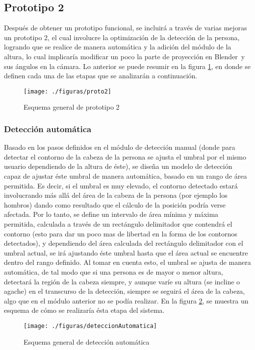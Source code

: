 \documentclass[a4paper,openright,12pt]{report}
\begin{document}
\subsection{Prototipo 2}
Después de obtener un prototipo funcional, se incluirá a través de varias mejoras un prototipo 2, el cual involucre la optimización de la detección de la persona, logrando que se realice de manera automática y la adición del módulo de la altura, lo cual implicaría modificar un poco la parte de proyección en Blender\textcopyright\ y sus ángulos en la cámara. Lo anterior se puede resumir en la figura \ref{fig:proto2}, en donde se definen cada una de las etapas que se analizarán a continuación.
\begin{figure}[th]
	\centering
	\texttt{[image: ./figuras/proto2]}
	\caption{Esquema general de prototipo 2} \label{fig:proto2}
\end{figure}

\subsubsection{Detección automática}
Basado en los pasos definidos en el módulo de detección manual (donde para detectar el contorno de la cabeza de la persona se ajusta el umbral por el mismo usuario dependiendo de la altura de éste), se diseña un modelo de detección capaz de ajustar éste umbral de manera automática, basado en un rango de área permitida. Es decir, si el umbral es muy elevado, el contorno detectado estará involucrando más allá del área de la cabeza de la persona (por ejemplo los hombros) dando como resultado que el cálculo de la posición podría verse afectada. Por lo tanto, se define un intervalo de área mínima y máxima permitida, calculada a través de un rectángulo delimitador que contendrá el contorno (esto para dar un poco mas de libertad en la forma de los contornos detectados), y dependiendo del área calculada del rectángulo delimitador con el umbral actual, se irá ajustando éste umbral hasta que el área actual se encuentre dentro del rango definido. Al tomar en cuenta esto, el umbral se ajusta de manera automática, de tal modo que si una persona es de mayor o menor altura, detectará la región de la cabeza siempre, y aunque varíe su altura (se incline o agache) en el transcurso de la detección, siempre se seguirá el área de la cabeza, algo que en el módulo anterior no se podía realizar. En la figura \ref{fig:deteccAutomatica}, se muestra un esquema de cómo se realizaría ésta etapa del sistema.
\vspace*{10mm}
\begin{figure}[th]
	\centering
	\texttt{[image: ./figuras/deteccionAutomatica]}
	\caption{Esquema general de detección automática} \label{fig:deteccAutomatica}
\end{figure}
\end{document}
